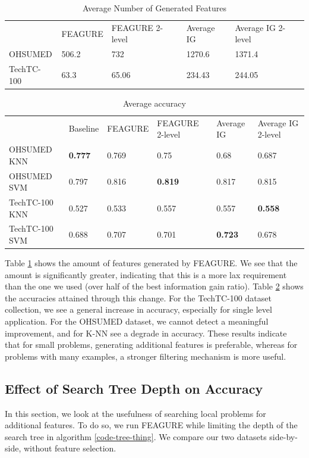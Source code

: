 \documentclass[twoside,11pt]{article}
\theoremstyle{definition}
\begin{document}
\begin{table}[]
	\centering
	\caption{Average Number of Generated Features}
	\label{table:features-average}
	\begin{tabular}{lllll}
		& FEAGURE  & FEAGURE 2-level  & Average IG &  Average IG 2-level \\
		OHSUMED      & 506.2           & 732        &    1270.6   &   1371.4       \\
		TechTC-100  & 63.3       & 65.06      &  234.43 &  244.05             
	\end{tabular}
\end{table}

\begin{table}[]
	\centering
	\caption{Average accuracy}
	\label{table:acc-average}
	\begin{tabular}{llllll}
		& Baseline    & FEAGURE   & FEAGURE 2-level  & Average IG & Average IG 2-level  \\
		OHSUMED KNN    & \textbf{0.777}  & 0.769   & 0.75  & 0.68  & 0.687            \\
		OHSUMED SVM    & 0.797  & 0.816    & \textbf{0.819} & 0.817 & 0.815 \\
		TechTC-100 KNN & 0.527 & 0.533 & 0.557 & 0.557 & \textbf{0.558} \\
		TechTC-100 SVM & 0.688  & 0.707  & 0.701  & \textbf{0.723} & 0.678
	\end{tabular}
\end{table}

Table \ref{table:features-average} shows the amount of features generated by FEAGURE. We see that the amount is significantly greater, indicating that this is a more lax requirement than the one we used (over half of the best information gain ratio). Table \ref{table:acc-average} shows the accuracies attained through this change. For the TechTC-100 dataset collection, we see a general increase in accuracy, especially for single level application. For the OHSUMED dataset, we cannot detect a meaningful improvement, and for K-NN see a degrade in accuracy. 
These results indicate that for small problems, generating additional features is preferable, whereas for problems with many examples, a stronger filtering mechanism is more useful. 


\subsection{Effect of Search Tree Depth on Accuracy}

In this section, we look at the usefulness of searching local problems for additional features.
To do so, we run FEAGURE while limiting the depth of the search tree in algorithm \ref{code-tree-thing}. 
We compare our two datasets side-by-side, without feature selection.
\end{document}
